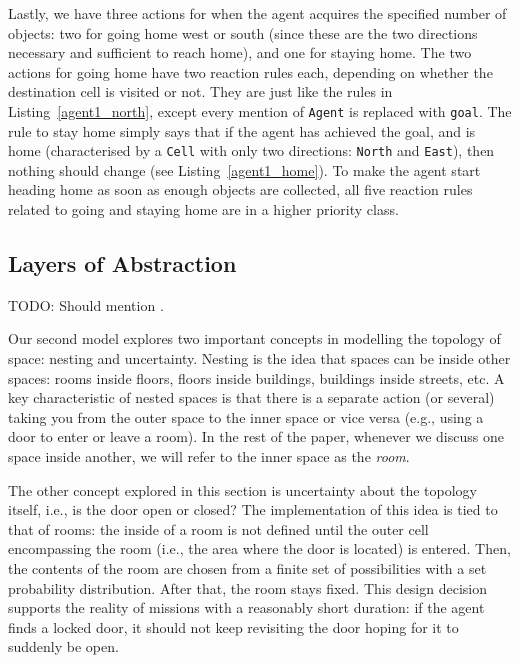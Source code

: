 \documentclass[runningheads]{llncs}
\begin{document}


Lastly, we have three actions for when the agent acquires the specified number
of objects: two for going home west or south (since these are the two directions
necessary and sufficient to reach home), and one for staying home. The two
actions for going home have two reaction rules each, depending on whether the
destination cell is visited or not. They are just like the rules in
Listing~\ref{agent1_north}, except every mention of \texttt{Agent} is replaced
with \texttt{goal}. The rule to stay home simply says that if the agent has
achieved the goal, and is home (characterised by a \texttt{Cell} with only two
directions: \texttt{North} and \texttt{East}), then nothing should change (see
Listing~\ref{agent1_home}). To make the agent start heading home as soon as
enough objects are collected, all five reaction rules related to going and
staying home are in a higher priority class.

\subsection{Layers of Abstraction}

TODO: Should mention \cite{DBLP:conf/giscience/WaltonW12}.

Our second model explores two important concepts in modelling the topology of
space: nesting and uncertainty. Nesting is the idea that spaces can be inside
other spaces: rooms inside floors, floors inside buildings, buildings inside
streets, etc. A key characteristic of nested spaces is that there is a separate
action (or several) taking you from the outer space to the inner space or vice
versa (e.g., using a door to enter or leave a room). In the rest of the paper,
whenever we discuss one space inside another, we will refer to the inner space
as the \emph{room}.

The other concept explored in this section is uncertainty about the topology
itself, i.e., is the door open or closed? The implementation of this idea is
tied to that of rooms: the inside of a room is not defined until the outer cell
encompassing the room (i.e., the area where the door is located) is entered.
Then, the contents of the room are chosen from a finite set of possibilities
with a set probability distribution. After that, the room stays fixed. This
design decision supports the reality of missions with a reasonably short
duration: if the agent finds a locked door, it should not keep revisiting the
door hoping for it to suddenly be open.
\end{document}
